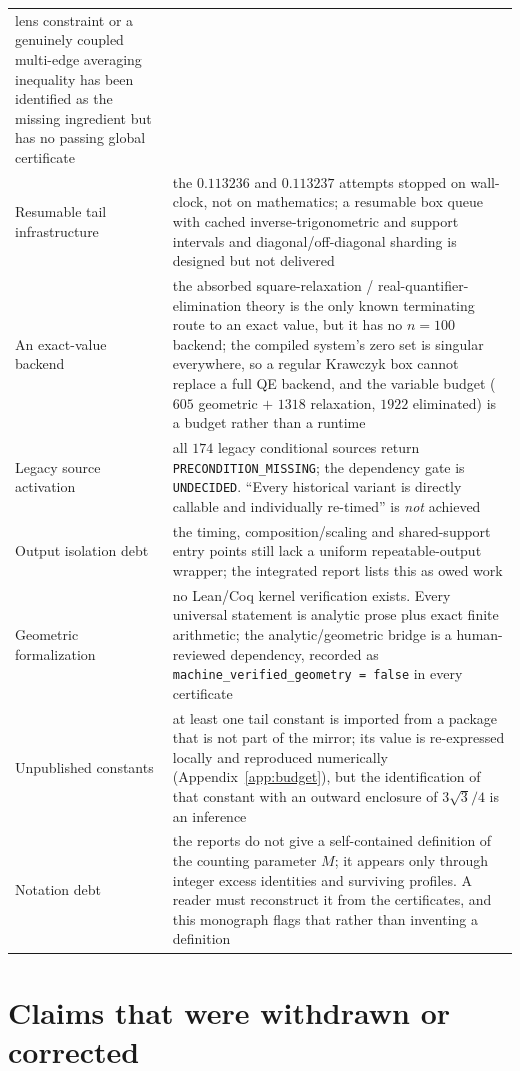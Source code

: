 {\begin{longtable}{@{}>{\raggedright\arraybackslash}p{}>{\raggedright\arraybackslash}p{}@{}}
lens constraint or a genuinely coupled multi-edge averaging inequality has been identified as the
missing ingredient but has no passing global certificate \\
Resumable tail infrastructure & the $0.113236$ and $0.113237$ attempts stopped on wall-clock, not on
mathematics; a resumable box queue with cached inverse-trigonometric and support intervals and
diagonal/off-diagonal sharding is designed but not delivered \\
An exact-value backend & the absorbed square-relaxation / real-quantifier-elimination theory is the
only known terminating route to an exact value, but it has no $n=100$ backend; the compiled system's
zero set is singular everywhere, so a regular Krawczyk box cannot replace a full QE backend, and the
variable budget ($605$ geometric $+$ $1318$ relaxation, $1922$ eliminated) is a budget rather than a
runtime \\
Legacy source activation & all $174$ legacy conditional sources return
\texttt{PRECONDITION\_\allowbreak{}MISSING}; the dependency gate is \texttt{UNDECIDED}. ``Every historical variant
is directly callable and individually re-timed'' is \emph{not} achieved \\
Output isolation debt & the timing, composition/scaling and shared-support entry points still lack a
uniform repeatable-output wrapper; the integrated report lists this as owed work \\
Geometric formalization & no Lean/Coq kernel verification exists. Every universal statement is
analytic prose plus exact finite arithmetic; the analytic/geometric bridge is a human-reviewed
dependency, recorded as \texttt{machine\_\allowbreak{}verified\_\allowbreak{}geometry = false} in every certificate \\
Unpublished constants & at least one tail constant is imported from a package that is not part of the
mirror; its value is re-expressed locally and reproduced numerically (Appendix~\ref{app:budget}), but
the identification of that constant with an outward enclosure of $3\sqrt3/4$ is an inference \\
Notation debt & the reports do not give a self-contained definition of the counting parameter $M$;
it appears only through integer excess identities and surviving profiles. A reader must reconstruct
it from the certificates, and this monograph flags that rather than inventing a definition \\
\end{longtable}}


\section{Claims that were withdrawn or corrected}

